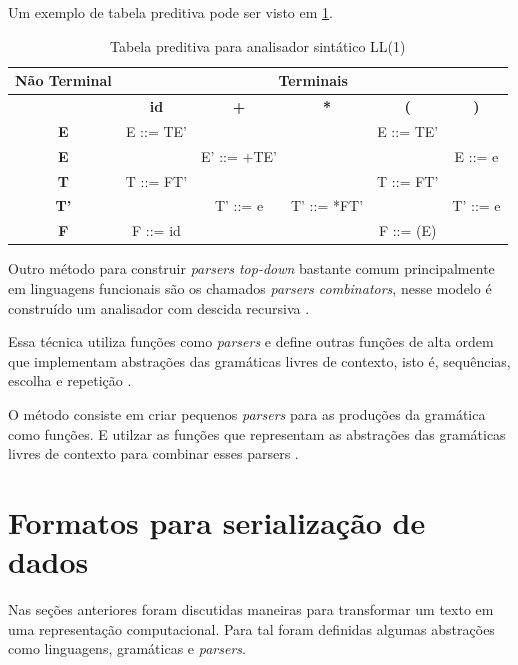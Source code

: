 Um exemplo de tabela preditiva pode ser visto em \ref{tbl:predictive}.

\begin{table}[h]
    \centering
	\caption{Tabela preditiva para analisador sintático LL(1)}
	\label{tbl:predictive}

    \begin{tabular}{cccccc}
        \toprule
        \multicolumn{1}{c}{\textbf{Não Terminal}} & \multicolumn{5}{c}{\textbf{Terminais}} \\
        \midrule
                       & \textbf{id} & \textbf{+} & \textbf{*} & \textbf{(} & \textbf{)}   \\
        \midrule
        \textbf{E}     & E ::= TE'  &            &             & E ::= TE'  &     \\
        \textbf{E}     &            & E' ::= +TE'&             &            & E ::= e   \\
        \textbf{T}     & T ::= FT'  &            &             & T ::= FT'  &     \\
        \textbf{T'}    &            & T' ::= e   & T' ::= *FT' &            & T' ::= e    \\
        \textbf{F}     & F ::= id   &            &             & F ::= (E)  &     \\
        \bottomrule
    \end{tabular}
\end{table}

Outro método para construir \textit{parsers top-down} bastante comum 
principalmente em linguagens funcionais são os chamados \textit{parsers combinators},
nesse modelo é construído um analisador com descida recursiva \cite{hutton1996monadic}.

Essa técnica utiliza funções como \textit{parsers} e define outras funções de alta ordem que
implementam abstrações das gramáticas livres de contexto, 
isto é, sequências, escolha e repetição \cite{hutton1996monadic}.

O método consiste em criar pequenos \textit{parsers} para as produções da gramática como funções. 
E utilzar as funções que representam as abstrações das gramáticas livres de contexto 
para combinar esses parsers \cite{hutton1996monadic}.

\section{Formatos para serialização de dados}

Nas seções anteriores foram discutidas maneiras para transformar um texto 
em uma representação computacional. Para tal foram definidas algumas abstrações
como linguagens, gramáticas e \textit{parsers}.


